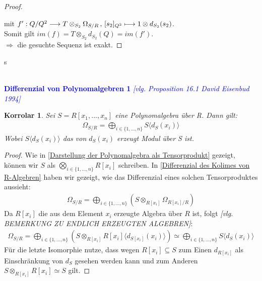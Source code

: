 \documentclass[10pt,a4paper]{report}
\newcommand{\ModulsOfDifferenzials}{David Eisenbud 1994}
\newcounter{Aussage}[chapter]
\newtheorem{korrolar}[Aussage]{Korrolar}
\newcommand{\function}[5]{\nolinebreak{#1:#2 \longrightarrow #3 \, , \, #4 \longmapsto #5}}
\newcommand{\divR}[2]{\Omega_{#1/#2}}
\newcommand{\divf}[1]{d_{#1}}
\newcommand{\Tensor}[3]{#1 \otimes_{#2} #3}
\newcommand{\tensor}[3]{#1 \otimes #3}
\newcommand{\immage}[1]{im(#1)}
\begin{document}
\begin{proof}
\begin{center}
\end{center}
mit $\function{f'}{Q/Q^2}{{\Tensor{T}{S_2}{\divR{S}{R}}}}{[s_2]_{Q^2}}{\tensor{1}{S_2}{\divf{S_2}(s_2)}}$.\\
Somit gilt $\immage{f} = \Tensor{T}{S_2}{\divf{S_2}(Q)} = \immage{f'}$.\\
$\Rightarrow$ die gesuchte Sequenz ist exakt.
\end{proof}s


\ \\
\textcolor{blue}{\textbf{Differenzial von Polynomalgebren 1} \textit{[vlg. Proposition 16.1 \ModulsOfDifferenzials]}}
\begin{korrolar}\label{Differenzial von Polynomalgebren 1}
Sei $S = R[x_1,...,x_n]$ eine Polynomalgebra über R. Dann gilt:
\begin{gather*}
\divR{S}{R} = \bigoplus_{i \in \lbrace 1,...,n \rbrace} S \langle \divf{S}(x_i) \rangle 
\end{gather*}
Wobei $S\langle \divf{S}(x_i)\rangle$ das von $\divf{S}(x_i)$ erzeugt Modul über S ist.
\end{korrolar}
\begin{proof}
Wie in \cref{Darstellung der Polynomalgebra als Tensorprodukt} gezeigt, können wir $S$ als $\bigotimes_{i \in \lbrace 1,...,n \rbrace} R[x_i]$ schreiben. In \cref{Differenzial des Kolimes von R-Algebren} haben wir gezeigt, wie das Differenzial eines solchen Tensorproduktes aussieht:
\begin{gather*}
\divR{S}{R} = \bigoplus_{i \in \lbrace 1,...,n \rbrace} (\Tensor{S}{R[x_i]}{\divR{R[x_i]}{R}})
\end{gather*}
Da $R[x_i]$ die aus dem Element $x_i$ erzeugte Algebra über $R$ ist, folgt \textit{[vlg. BEMERKUNG ZU ENDLICH ERZEUGTEN ALGEBREN]}: 
\begin{gather*}
\divR{S}{R} = \bigoplus_{i \in \lbrace 1,...,n \rbrace} (\Tensor{S}{R[x_i]}{R[x_i]\langle \divf{S[x_i]}(x_i) \rangle})
\simeq \bigoplus_{i \in \lbrace 1,...,n \rbrace} S \langle \divf{S}(x_i) \rangle 
\end{gather*}
Für die letzte Isomorphie nutze, dass wegen $R[x_i] \subseteq S$ zum Einen $\divf{R[x_i]}$ als Einschränkung von $\divf{S}$ gesehen werden kann und zum Anderen $\Tensor{S}{R[x_i]}{R[x_i]} \simeq S$ gilt.
\end{proof}
\end{document}
